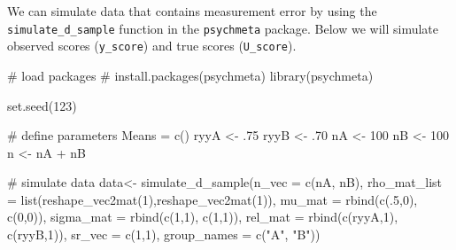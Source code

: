 \documentclass[
  letterpaper,
  DIV=11,
  numbers=noendperiod]{scrreprt}
\newenvironment{Shaded}{\begin{snugshade}}{\end{snugshade}}
\newcommand{\AttributeTok}[1]{\textcolor[rgb]{0.40,0.45,0.13}{#1}}
\newcommand{\CommentTok}[1]{\textcolor[rgb]{0.37,0.37,0.37}{#1}}
\newcommand{\DecValTok}[1]{\textcolor[rgb]{0.68,0.00,0.00}{#1}}
\newcommand{\FunctionTok}[1]{\textcolor[rgb]{0.28,0.35,0.67}{#1}}
\newcommand{\NormalTok}[1]{\textcolor[rgb]{0.00,0.23,0.31}{#1}}
\newcommand{\OtherTok}[1]{\textcolor[rgb]{0.00,0.23,0.31}{#1}}
\newcommand{\SpecialCharTok}[1]{\textcolor[rgb]{0.37,0.37,0.37}{#1}}
\newcommand{\StringTok}[1]{\textcolor[rgb]{0.13,0.47,0.30}{#1}}
\begin{document}
We can simulate data that contains measurement error by using the
\texttt{simulate\_d\_sample} function in the \texttt{psychmeta} package.
Below we will simulate observed scores (\texttt{y\_score}) and true
scores (\texttt{U\_score}).

\begin{Shaded}
\begin{Highlighting}[]
\CommentTok{\# load packages}
\CommentTok{\# install.packages(\textquotesingle{}psychmeta\textquotesingle{})}
\FunctionTok{library}\NormalTok{(psychmeta)}

\FunctionTok{set.seed}\NormalTok{(}\DecValTok{123}\NormalTok{)}

\CommentTok{\# define parameters}
\NormalTok{Means }\OtherTok{=} \FunctionTok{c}\NormalTok{()}
\NormalTok{ryyA }\OtherTok{\textless{}{-}}\NormalTok{ .}\DecValTok{75}
\NormalTok{ryyB }\OtherTok{\textless{}{-}}\NormalTok{ .}\DecValTok{70}
\NormalTok{nA }\OtherTok{\textless{}{-}} \DecValTok{100}
\NormalTok{nB }\OtherTok{\textless{}{-}} \DecValTok{100}
\NormalTok{n }\OtherTok{\textless{}{-}}\NormalTok{ nA }\SpecialCharTok{+}\NormalTok{ nB}

\CommentTok{\# simulate data}
\NormalTok{data}\OtherTok{\textless{}{-}} \FunctionTok{simulate\_d\_sample}\NormalTok{(}\AttributeTok{n\_vec =} \FunctionTok{c}\NormalTok{(nA, nB), }
                         \AttributeTok{rho\_mat\_list =} \FunctionTok{list}\NormalTok{(}\FunctionTok{reshape\_vec2mat}\NormalTok{(}\DecValTok{1}\NormalTok{),}\FunctionTok{reshape\_vec2mat}\NormalTok{(}\DecValTok{1}\NormalTok{)),}
                         \AttributeTok{mu\_mat =} \FunctionTok{rbind}\NormalTok{(}\FunctionTok{c}\NormalTok{(.}\DecValTok{5}\NormalTok{,}\DecValTok{0}\NormalTok{),}
                                        \FunctionTok{c}\NormalTok{(}\DecValTok{0}\NormalTok{,}\DecValTok{0}\NormalTok{)), }
                         \AttributeTok{sigma\_mat =} \FunctionTok{rbind}\NormalTok{(}\FunctionTok{c}\NormalTok{(}\DecValTok{1}\NormalTok{,}\DecValTok{1}\NormalTok{),}
                                           \FunctionTok{c}\NormalTok{(}\DecValTok{1}\NormalTok{,}\DecValTok{1}\NormalTok{)),}
                         \AttributeTok{rel\_mat =} \FunctionTok{rbind}\NormalTok{(}\FunctionTok{c}\NormalTok{(ryyA,}\DecValTok{1}\NormalTok{),}
                                         \FunctionTok{c}\NormalTok{(ryyB,}\DecValTok{1}\NormalTok{)), }
                         \AttributeTok{sr\_vec =} \FunctionTok{c}\NormalTok{(}\DecValTok{1}\NormalTok{,}\DecValTok{1}\NormalTok{),}
                         \AttributeTok{group\_names =} \FunctionTok{c}\NormalTok{(}\StringTok{"A"}\NormalTok{, }\StringTok{"B"}\NormalTok{))}


\end{Highlighting}
\end{Shaded}
\end{document}
